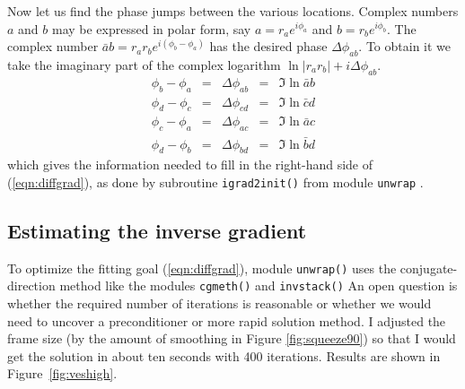 Now let us find the phase jumps between the various locations. Complex numbers $a$ and $b$ may be expressed in polar form, say $a=r_ae^{i\phi_a}$ and $b=r_be^{i\phi_b}$.
The complex number 
$\bar a b = r_a r_b e^{i(\phi_b-\phi_a)}$ has the desired phase
$\Delta \phi_{ab}$.
To obtain it we take the imaginary part of the complex logarithm
$\ln |r_a r_b| + i\Delta \phi_{ab}$.
\begin{equation}
  \begin{array}{lllll}
        \phi_b-\phi_a &=& \Delta \phi_{ab} &=& \Im \ln  \bar a b\\
        \phi_d-\phi_c &=& \Delta \phi_{cd} &=& \Im \ln  \bar c d\\
        \phi_c-\phi_a &=& \Delta \phi_{ac} &=& \Im \ln  \bar a c\\
        \phi_d-\phi_b &=& \Delta \phi_{bd} &=& \Im \ln  \bar b d
  \end{array}
\label{eqn:thedeltas}
\end{equation}
which gives the information needed to fill in the right-hand side of
(\ref{eqn:diffgrad}), as done by subroutine \texttt{igrad2init()} from
module \texttt{unwrap} .
\subsection{Estimating the inverse gradient}
To optimize the fitting goal (\ref{eqn:diffgrad}),
module \texttt{unwrap()} uses the conjugate-direction method
like the modules \texttt{cgmeth()}
and 
\texttt{invstack()}
An open question is whether the required number of iterations is reasonable
or whether we would need to uncover a preconditioner
or more rapid solution method.
I adjusted the frame size 
(by the amount of smoothing in Figure \ref{fig:squeeze90})
so that I would get the solution in about ten seconds with 400 iterations.
Results are shown in Figure~\ref{fig:veshigh}.

\begin{comment}
When we are working with figures like Figure~\ref{fig:veshigh},
the number of iterations often exceeds the number of intermediate
output frames that we care to deal with.
The computer function \texttt{klick()} is a simple tool
to detect logarithmically spaced intervals for taking snapshots
of iterative descent.
\progdex{klick}{Logarithmic increment detect}
\end{comment}

